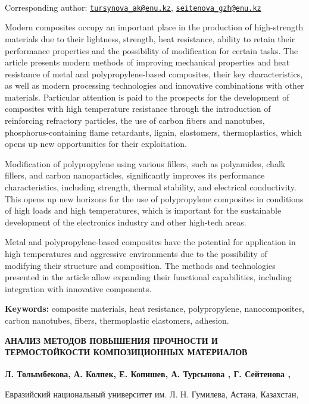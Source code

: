 {\bfseries \textsuperscript{\envelope }}Corresponding author:
\href{mailto:tursynova_ak@enu.kz}{\nolinkurl{tursynova\_ak@enu.kz}},
\href{mailto:seitenova_gzh@enu.kz}{\nolinkurl{seitenova\_gzh@enu.kz}}

Modern composites occupy an important place in the production of
high-strength materials due to their lightness, strength, heat
resistance, ability to retain their performance properties and the
possibility of modification for certain tasks. The article presents
modern methods of improving mechanical properties and heat resistance of
metal and polypropylene-based composites, their key characteristics, as
well as modern processing technologies and innovative combinations with
other materials. Particular attention is paid to the prospects for the
development of composites with high temperature resistance through the
introduction of reinforcing refractory particles, the use of carbon
fibers and nanotubes, phosphorus-containing flame retardants, lignin,
elastomers, thermoplastics, which opens up new opportunities for their
exploitation.

Modification of polypropylene using various fillers, such as polyamides,
chalk fillers, and carbon nanoparticles, significantly improves its
performance characteristics, including strength, thermal stability, and
electrical conductivity. This opens up new horizons for the use of
polypropylene composites in conditions of high loads and high
temperatures, which is important for the sustainable development of the
electronics industry and other high-tech areas.

Metal and polypropylene-based composites have the potential for
application in high temperatures and aggressive environments due to the
possibility of modifying their structure and composition. The methods
and technologies presented in the article allow expanding their
functional capabilities, including integration with innovative
components.

{\bfseries Keywords:} composite materials, heat resistance, polypropylene,
nanocomposites, carbon nanotubes, fibers, thermoplastic elastomers,
adhesion.

{\bfseries АНАЛИЗ МЕТОДОВ ПОВЫШЕНИЯ ПРОЧНОСТИ И ТЕРМОСТОЙКОСТИ
КОМПОЗИЦИОННЫХ МАТЕРИАЛОВ}

{\bfseries Л. Толымбекова, А. Колпек, Е. Копишев, А. Турсынова
\textsuperscript{\envelope } , Г. Сейтенова \textsuperscript{\envelope },}

Евразийский национальный университет им. Л. Н. Гумилева, Астана,
Казахстан,

